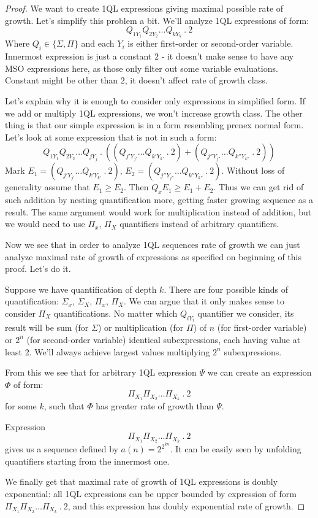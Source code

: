 \documentclass[12pt]{article}
\theoremstyle{definition}
\begin{document}
\begin{proof}
We want to create 1QL expressions giving maximal possible rate of growth. Let's simplify this problem a bit. We'll analyze 1QL expressions of form:
$$Q_{1Y_1}Q_{2Y_2} \ldots Q_{kY_k} \ . \ 2$$
Where $Q_i \in \{ \Sigma, \Pi \}$ and each $Y_i$ is either first-order or second-order variable. Innermost expression is just a constant $2$ - it doesn't make sense to have any MSO expressions here, as those only filter out some variable evaluations. Constant might be other than $2$, it doesn't affect rate of growth class.

Let's explain why it is enough to consider only expressions in simplified form. If we add or multiply 1QL expressions, we won't increase growth class. The other thing is that our simple expression is in a form resembling prenex normal form. Let's look at some expression that is not in such a form:
$$Q_{1Y_1}Q_{2Y_2} \ldots Q_{jY_j} \ . \ ((Q_{j'Y_{j'}} \ldots Q_{k'Y_{k'}} \ . \ 2) + (Q_{j''Y_{j''}} \ldots Q_{k''Y_{k''}} \ . \ 2))$$
Mark $E_1 = (Q_{j'Y_{j'}} \ldots Q_{k'Y_{k'}} \ . \ 2)$, $E_2 = (Q_{j''Y_{j''}} \ldots Q_{k''Y_{k''}} \ . \ 2)$. Without loss of generality assume that $E_1 \geq E_2$. Then $Q_xE_1 \geq E_1 + E_2$. Thus we can get rid of such addition by nesting quantification more, getting faster growing sequence as a result. The same argument would work for multiplication instead of addition, but we would need to use $\Pi_x$, $\Pi_X$ quantifiers instead of arbitrary quantifiers.

Now we see that in order to analyze 1QL sequences rate of growth we can just analyze maximal rate of growth of expressions as specified on beginning of this proof. Let's do it.

Suppose we have quantification of depth $k$. There are four possible kinds of quantification: $\Sigma_x$, $\Sigma_X$, $\Pi_x$, $\Pi_X$. We can argue that it only makes sense to consider $\Pi_X$ quantifications. No matter which $Q_{iY_i}$ quantifier we consider, its result will be sum (for $\Sigma$) or multiplication (for $\Pi$) of $n$ (for first-order variable) or $2^n$ (for second-order variable) identical subexpressions, each having value at least 2. We'll always achieve largest values multiplying $2^n$ subexpressions. 

From this we see that for arbitrary 1QL expression $\varPsi$ we can create an expression $\varPhi$ of form:
$$\Pi_{X_1}\Pi_{X_2}\ldots \Pi_{X_k} \ . \ 2$$
for some $k$, such that $\varPhi$ has greater rate of growth than $\varPsi$. 

Expression $$\Pi_{X_1}\Pi_{X_2}\ldots \Pi_{X_k} \ . \ 2$$ gives us a sequence defined by $a(n) = 2^{2^{kn}}$. It can be easily seen by unfolding quantifiers starting from the innermost one.

We finally get that maximal rate of growth of 1QL expressions is doubly exponential: all 1QL expressions can be upper bounded by expression of form $\Pi_{X_1}\Pi_{X_2}\ldots \Pi_{X_k} \ . \ 2$, and this expression has doubly exponential rate of growth.
\end{proof}
\end{document}
